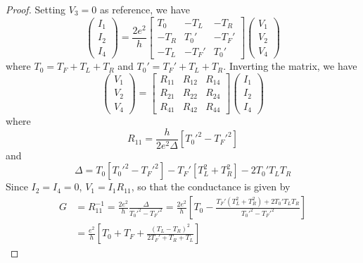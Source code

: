 \documentclass[11pt,a4paper]{article}
\theoremstyle{plain}
\theoremstyle{definition}
\theoremstyle{remark}
\begin{document}
\begin{proof}
    Setting $V_3 = 0$ as reference, we have
    \begin{equation*}
    \begin{pmatrix}
            I_1 \\ I_2 \\ I_4
        \end{pmatrix}
        = \frac{2e^2}{h}
        \begin{bmatrix}
            T_0 & -T_L & -T_R\\
            -T_R & T_0' & -T_F'\\
            -T_L & -T_F' & T_0'
        \end{bmatrix}
        \begin{pmatrix}
            V_1 \\ V_2 \\ V_4
        \end{pmatrix}
    \end{equation*}
    where $T_0 = T_F+T_L+T_R$ and $T_0' = T_F' + T_L + T_R$. Inverting the matrix, we have
    \begin{equation*}
        \begin{pmatrix}
            V_1 \\ V_2 \\ V_4
        \end{pmatrix}
        =
        \begin{bmatrix}
            R_{11} & R_{12} & R_{14}\\
            R_{21} & R_{22} & R_{24}\\
            R_{41} & R_{42} & R_{44}
        \end{bmatrix}
        \begin{pmatrix}
            I_1 \\ I_2 \\ I_4
        \end{pmatrix}
    \end{equation*}
    where
    \begin{equation*}
        R_{11} = \frac{h}{2e^2 \Delta} \left[T_0'^2 - T_F'^2\right]
    \end{equation*}
    and
    \begin{equation*}
        \Delta = T_0\left[ T_0'^2 - T_F'^2 \right]- T_F' \left[T_L^2 + T_R^2\right] - 2T_0' T_L T_R
    \end{equation*}
    Since $I_2 = I_4 = 0$, $V_1 = I_1 R_{11}$, so that the conductance is given by
    \begin{equation*}
        \begin{aligned}
            G & = R_11^{-1} = \frac{2e^2}{h} \frac{\Delta}{T_0'^2 - T_F'^2} = \frac{2e^2}{h} \left[T_0 - \frac{T_F' (T_L^2 + T_R^2) + 2T_0' T_L T_R}{T_0'^2 - T_F'^2}\right] \\
            & = \frac{e^2}{h} \left[ T_0 + T_F + \frac{(T_L - T_R)^2}{2T_F' + T_R + T_L}\right]
        \end{aligned}
    \end{equation*}
\end{proof}
\end{document}
